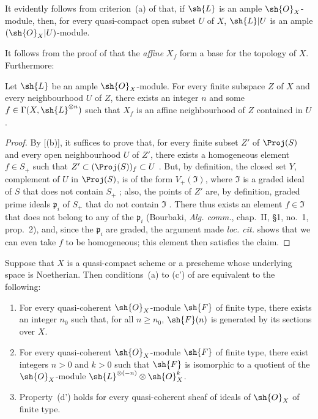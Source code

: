 It evidently follows from criterion~(a) of  that, if $\sh{L}$ is an ample $\sh{O}_X$-module, then, for every quasi-compact open subset $U$ of $X$, $\sh{L}|U$ is an ample $(\sh{O}_X|U)$-module.

It follows from the proof of  that the \emph{affine} $X_f$ form a base for the topology of $X$.
Furthermore:

\begin{corollary}[4.5.4]
\label{II.4.5.4}
Let $\sh{L}$ be an ample $\sh{O}_X$-module.
For every finite subspace $Z$ of $X$ and every neighbourhood $U$ of $Z$, there exists an integer $n$ and some $f\in\Gamma(X,\sh{L}^{\otimes n})$ such that $X_f$ is an affine neighbourhood of $Z$ contained in $U$.
\end{corollary}

\begin{proof}
By [(b)], it suffices to prove that, for every finite subset $Z'$ of $\Proj(S)$ and every open neighbourhood $U$ of $Z'$, there exists a homogeneous element $f\in S_+$ such that $Z'\subset(\Proj(S))_f\subset U$ .
But, by definition, the closed set $Y$, complement of $U$ in $\Proj(S)$, is of the form $V_+(\mathfrak{I})$, where $\mathfrak{I}$ is a graded ideal of $S$ that does not contain $S_+$ ;
also, the points of $Z'$ are, by definition, graded prime ideals $\mathfrak{p}_i$ of $S_+$ that do not contain $\mathfrak{I}$ .
There thus exists an element $f\in\mathfrak{I}$ that does not belong to any of the $\mathfrak{p}_i$ (Bourbaki, \emph{Alg. comm.}, chap.~II, \S1, no.~1, prop.~2), and, since the $\mathfrak{p}_i$ are graded, the argument made \emph{loc. cit.} shows that we can even take $f$ to be homogeneous;
this element then satisfies the claim.
\end{proof}

\begin{proposition}[4.5.5]
\label{II.4.5.5}
Suppose that $X$ is a quasi-compact scheme or a prescheme whose underlying space is Noetherian.
Then conditions~(a) to (c') of  are equivalent to the following:
\begin{enumerate}
  \item[\rm{(d)}] For every quasi-coherent $\sh{O}_X$-module $\sh{F}$ of finite type, there exists an integer $n_0$ such that, for all $n\geq n_0$, $\sh{F}(n)$ is generated by its sections over $X$.
  \item[\rm{(d')}] For every quasi-coherent $\sh{O}_X$-module $\sh{F}$ of finite type, there exist integers $n>0$ and $k>0$ such that $\sh{F}$ is isomorphic to a quotient of the $\sh{O}_X$-module $\sh{L}^{\otimes(-n)}\otimes\sh{O}_X^k$.
  \item[\rm{(d'')}] Property~(d') holds for every quasi-coherent sheaf of ideals of $\sh{O}_X$ of finite type.
\end{enumerate}
\end{proposition}

